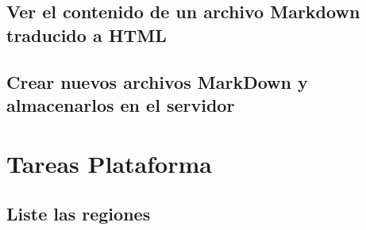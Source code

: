\documentclass{article}
\begin{document}
	\subsection{Ver el contenido de un archivo Markdown traducido a HTML}
	\subsection{Crear nuevos archivos MarkDown y almacenarlos en el servidor}

	\section{Tareas Plataforma}
	\subsection{Liste las regiones}
\end{document}
